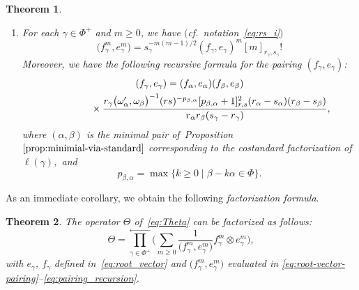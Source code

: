 \documentclass[10pt,a4paper]{amsart}
\numberwithin{equation}{section}
\newtheorem{Theorem}{Theorem}[section]
\begin{document}
\begin{Theorem}
\begin{enumerate}
\item[$(c)$] For each $\gamma \in \Phi^{+}$ and $m \ge 0$, we have $($cf.\ notation~\eqref{eq:rs_i}$)$
\begin{equation}\label{eq:root-vector-pairing}
 \bigl(f_{\gamma}^{m},e_{\gamma}^{m}\bigr) = s_{\gamma}^{-m(m - 1)/2} (f_{\gamma},e_{\gamma})^{m}[m]_{r_{\gamma},s_{\gamma}}!
\end{equation}
Moreover, we have the following recursive formula for the pairing $(f_\gamma,e_\gamma)$:
\begin{gather}
 (f_{\gamma},e_{\gamma}) = (f_{\alpha},e_{\alpha}) (f_{\beta},e_{\beta})\nonumber \\
 \hphantom{(f_{\gamma},e_{\gamma}) =}{}\times
 \frac{r_{\gamma}\bigl(\omega_{\alpha}',\omega_{\beta}\bigr)^{-1}(rs)^{-p_{\beta,\alpha}}[p_{\beta,\alpha} + 1]_{r,s}^{2}(r_{\alpha} - s_{\alpha})(r_{\beta} - s_{\beta})}
 {r_{\alpha}r_{\beta}(s_{\gamma} - r_{\gamma})},\label{eq:pairing_recursion}
\end{gather}
where $(\alpha,\beta)$ is the minimal pair of~Proposition~$\ref{prop:minimial-via-standard}$ corresponding to the costandard factorization of $\ell(\gamma)$,~and
\begin{displaymath}
 p_{\beta,\alpha} = \max \{k \ge 0\mid \beta - k\alpha \in \Phi\}.
\end{displaymath}
\end{enumerate}
\end{Theorem}


As an immediate corollary, we obtain the following \textit{factorization formula}.


\begin{Theorem}\label{cor:Theta-factorization} The operator $\Theta$ of~\eqref{eq:Theta} can be factorized as follows:
\begin{equation}\label{eq:Theta-factorized}
 \Theta=\overset{\longleftarrow}{\underset{\gamma \in \Phi^{+}}{\prod}}
 \biggl( \sum_{m\geq 0} \frac{1}{\bigl(f^m_{\gamma},e^m_{\gamma}\bigr)} f^m_\gamma\otimes e^m_\gamma \biggr),
\end{equation}
with $e_\gamma$, $f_\gamma$ defined in~\eqref{eq:root_vector} and $\bigl(f_{\gamma}^m,e_{\gamma}^m\bigr)$ evaluated in \eqref{eq:root-vector-pairing}--\eqref{eq:pairing_recursion}.
\end{Theorem}
\end{document}
